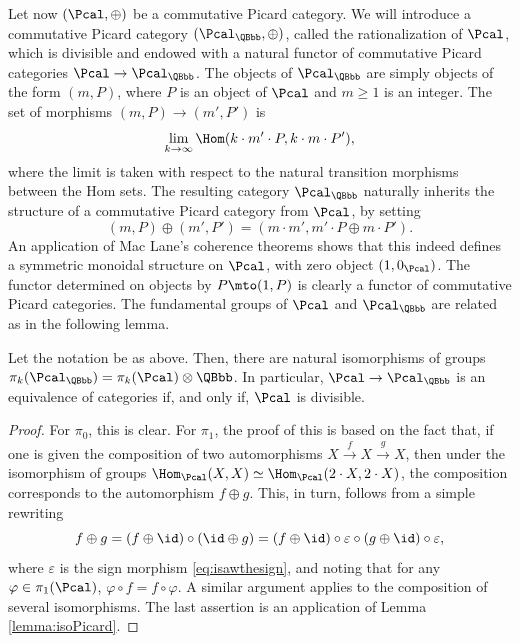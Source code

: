 Let now $(\Pcal,\oplus)$ be a commutative Picard category. We will introduce a commutative Picard category $(\Pcal_{\QBbb}, \oplus)$, called the rationalization of $\Pcal$, which is divisible and endowed with a natural functor of commutative Picard categories $\Pcal \to \Pcal_{\QBbb}$. The objects of $\Pcal_{\QBbb}$ are simply objects of the form $(m, P)$, where $P$ is an object of $\Pcal$ and $m\geq 1$ is an integer. The set of morphisms $(m,P) \to (m', P')$ is
\begin{displaymath}
\lim_{k \to \infty} \Hom(k \cdot m'\cdot P, k \cdot m\cdot P'),
\end{displaymath}
where the limit is taken with respect to the natural transition morphisms between the Hom sets. The resulting category $\Pcal_{\QBbb}$ naturally inherits the structure of a commutative Picard category from $\Pcal$, by setting
\begin{displaymath}
(m,P) \oplus (m', P') = (m \cdot m', m' \cdot P \oplus m \cdot P').
\end{displaymath}
An application of Mac Lane's coherence theorems shows that this indeed defines a symmetric monoidal structure on $\Pcal$, with zero object $(1,0_{\Pcal})$. The functor determined on objects by $P \mto (1,P)$ is clearly a functor of commutative Picard categories. The fundamental groups of $\Pcal$ and $\Pcal_{\QBbb}$ are related as in the following lemma.
\begin{lemma}
Let the notation be as above. Then, there are natural isomorphisms of groups $\pi_{k}(\Pcal_{\QBbb})=\pi_{k}(\Pcal)\otimes\QBbb$. In particular, $\Pcal \to \Pcal_\QBbb$ is an equivalence of categories if, and only if, $\Pcal$ is divisible.
\end{lemma}
\begin{proof}
For $\pi_{0}$, this is clear. For $\pi_{1}$, the proof of this is based on the fact that, if one is given the composition of two automorphisms $X \stackrel{f}{\to} X \stackrel{g}{\to} X$, then under the isomorphism of groups $\Hom_{\Pcal}(X, X) \simeq \Hom_{\Pcal} (2\cdot X, 2\cdot X)$, the composition corresponds to the automorphism $f\oplus g$. This, in turn, follows from a simple rewriting\vspace*{-3pt}
\begin{displaymath}
f\oplus g = (f \oplus \id) \circ (\id \oplus g) = (f \oplus \id) \circ \varepsilon \circ (g \oplus \id) \circ \varepsilon,
\end{displaymath}
where $\varepsilon$ is the sign morphism \eqref{eq:isawthesign}, and noting that for any $\varphi \in \pi_1(\Pcal)$, $\varphi \circ f = f \circ \varphi$. A similar argument applies to the composition of several isomorphisms. The last assertion is an application of Lemma \ref{lemma:isoPicard}.
\end{proof}

